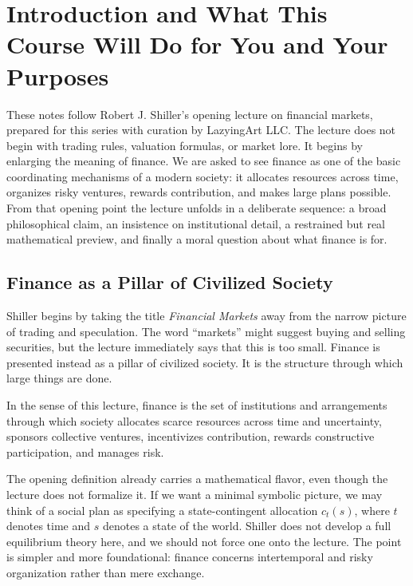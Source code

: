 \chapter{Introduction and What This Course Will Do for You and Your Purposes}

These notes follow Robert J. Shiller's opening lecture on financial markets, prepared for this series with curation by LazyingArt LLC. The lecture does not begin with trading rules, valuation formulas, or market lore. It begins by enlarging the meaning of finance. We are asked to see finance as one of the basic coordinating mechanisms of a modern society: it allocates resources across time, organizes risky ventures, rewards contribution, and makes large plans possible. From that opening point the lecture unfolds in a deliberate sequence: a broad philosophical claim, an insistence on institutional detail, a restrained but real mathematical preview, and finally a moral question about what finance is for.

\section{Finance as a Pillar of Civilized Society}

Shiller begins by taking the title \emph{Financial Markets} away from the narrow picture of trading and speculation. The word ``markets'' might suggest buying and selling securities, but the lecture immediately says that this is too small. Finance is presented instead as a pillar of civilized society. It is the structure through which large things are done.

\begin{definition}
In the sense of this lecture, finance is the set of institutions and arrangements through which society allocates scarce resources across time and uncertainty, sponsors collective ventures, incentivizes contribution, rewards constructive participation, and manages risk.
\end{definition}

The opening definition already carries a mathematical flavor, even though the lecture does not formalize it. If we want a minimal symbolic picture, we may think of a social plan as specifying a state-contingent allocation \(c_t(s)\), where \(t\) denotes time and \(s\) denotes a state of the world. Shiller does not develop a full equilibrium theory here, and we should not force one onto the lecture. The point is simpler and more foundational: finance concerns intertemporal and risky organization rather than mere exchange.

